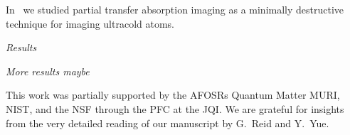 \documentclass[
superscriptaddress,
amsmath,
amssymb,
aps,
prl,
twocolumn,
floatfix
]{revtex4-1}
\begin{document}
In~\cite{seroka_repeated_2019} we studied partial transfer absorption imaging as a minimally destructive technique for imaging ultracold atoms.  
%
%

{\it Results}  

%
%


{\it More results maybe} 

%
%


\begin{acknowledgments}
This work was partially supported by the AFOSRs Quantum Matter MURI, NIST, and the NSF through the PFC at the JQI.
We are grateful for insights from the very detailed reading of our manuscript by G.~Reid and Y.~Yue.
\end{acknowledgments}


\end{document}
